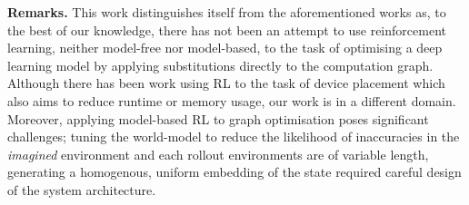\textbf{Remarks.} This work distinguishes itself from the aforementioned works as, to the best of our knowledge, there has not been an attempt to use reinforcement learning, neither model-free nor model-based, to the task of optimising a deep learning model by applying substitutions directly to the computation graph. Although there has been work using RL to the task of device placement \cite{addanki2019placeto, paliwal2020reinforced} which also aims to reduce runtime or memory usage, our work is in a different domain. Moreover, applying model-based RL to graph optimisation poses significant challenges; tuning the world-model to reduce the likelihood of inaccuracies in the \textit{imagined} environment and each rollout environments are of variable length, generating a homogenous, uniform embedding of the state required careful design of the system architecture.

